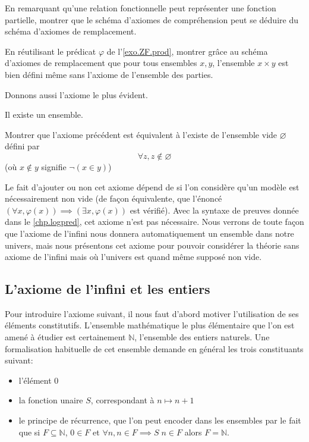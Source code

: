 \begin{exercise}
  En remarquant qu'une relation fonctionnelle peut représenter une fonction
  partielle, montrer que le schéma d'axiomes de compréhension peut se déduire du
  schéma d'axiomes de remplacement.
\end{exercise}

\begin{exercise}\label{exo.ZF.prod2}
  En réutilisant le prédicat $\varphi$ de l'\cref{exo.ZF.prod}, montrer grâce au
  schéma d'axiomes de remplacement que pour tous ensembles $x,y$, l'ensemble
  $x\times y$ est bien défini même sans l'axiome de l'ensemble des parties.
\end{exercise}

Donnons aussi l'axiome le plus évident.

\begin{axiom}\label{ax.ZF.nonEmpty}
  Il existe un ensemble.
\end{axiom}

\begin{exercise}
  Montrer que l'axiome précédent est équivalent à l'existe de l'ensemble vide
  $\varnothing$ défini par \[\forall z, z\notin \varnothing\]
  (où $x\notin y$ signifie $\lnot(x\in y)$) 
\end{exercise}

\begin{remark}
  Le fait d'ajouter ou non cet axiome dépend de si l'on considère qu'un modèle
  est nécessairement non vide (de façon équivalente, que l'énoncé
  $(\forall x, \varphi(x)) \implies (\exists x,\varphi(x))$ est vérifié). Avec
  la syntaxe de preuves donnée dans le \cref{chp.logpred}, cet axiome n'est pas
  nécessaire. Nous verrons de toute façon que l'axiome de l'infini nous donnera
  automatiquement un ensemble dans notre univers, mais nous présentons cet
  axiome pour pouvoir considérer la théorie sans axiome de l'infini mais où
  l'univers est quand même supposé non vide.
\end{remark}

\subsection{L'axiome de l'infini et les entiers}

Pour introduire l'axiome suivant, il nous faut d'abord motiver l'utilisation de
ses éléments constitutifs. L'ensemble mathématique le plus élémentaire que l'on
est amené à étudier est certainement $\mathbb N$, l'ensemble des entiers
naturels. Une formalisation habituelle de cet ensemble demande en général les
trois constituants suivant:
\begin{itemize}
\item l'élément $0$
\item la fonction unaire $S$, correspondant à $n \mapsto n + 1$
\item le principe de récurrence, que l'on peut encoder dans les ensembles par le
  fait que si $F\subseteq\mathbb N$, $0 \in F$ et
  $\forall n, n\in F \implies S\;n \in F$ alors $F = \mathbb N$.
\end{itemize}

